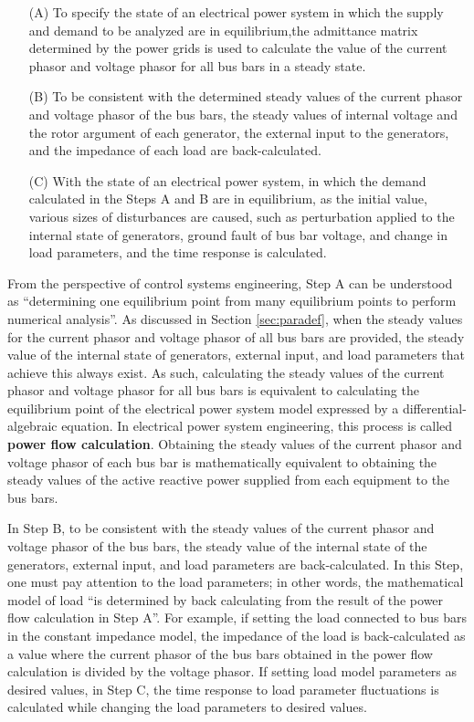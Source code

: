 \documentclass[tombow,dvipdfmx]{corona-a5-1.1}
\begin{document}
\medskip
\begin{breakbox}
\begin{itemize}
\item[(A)] To specify the state of an electrical power system in which the supply and demand to be analyzed are in equilibrium,the admittance matrix determined by the power grids is used to calculate the value of the current phasor and voltage phasor for all bus bars in a steady state. 
\item[(B)] To be consistent with the determined steady values of the current phasor and voltage phasor of the bus bars, the steady values of internal voltage and the rotor argument of each generator, the external input to the generators, and the impedance of each load are back-calculated.
\item[(C)] With the state of an electrical power system, in which the demand calculated in the Steps A and B are in equilibrium, as the initial value, various sizes of disturbances are caused, such as perturbation applied to the internal state of generators, ground fault of bus bar voltage, and change in load parameters, and the time response is calculated.
\end{itemize}
\end{breakbox}
\medskip

From the perspective of control systems engineering, Step A can be understood as “determining one equilibrium point from many equilibrium points to perform numerical analysis”.
As discussed in Section \ref{sec:paradef}, when the steady values for the current phasor and voltage phasor of all bus bars are provided, the steady value of the internal state of generators, external input, and load parameters that achieve this always exist.
As such, calculating the steady values of the current phasor and voltage phasor for all bus bars is equivalent to calculating the equilibrium point of the electrical power system model expressed by a differential-algebraic equation.
In electrical power system engineering, this process is called \textbf{power flow calculation}. Obtaining the steady values of the current phasor and voltage phasor of each bus bar is mathematically equivalent to obtaining the steady values of the active reactive power supplied from each equipment to the bus bars. 

In Step B, to be consistent with the steady values of the current phasor and voltage phasor of the bus bars, the steady value of the internal state of the generators, external input, and load parameters are back-calculated.
In this Step, one must pay attention to the load parameters; in other words, the mathematical model of load “is determined by back calculating from the result of the power flow calculation in Step A”.
For example, if setting the load connected to bus bars in the constant impedance model, the impedance of the load is back-calculated as a value where the current phasor of the bus bars obtained in the power flow calculation is divided by the voltage phasor.
If setting load model parameters as desired values, in Step C, the time response to load parameter fluctuations is calculated while changing the load parameters to desired values. 
\end{document}
